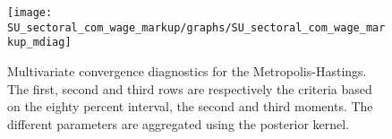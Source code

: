  
\begin{figure}[H]
\centering 
\texttt{[image: SU\_sectoral\_com\_wage\_markup/graphs/SU\_sectoral\_com\_wage\_markup\_mdiag]}
\caption{Multivariate convergence diagnostics for the Metropolis-Hastings.
The first, second and third rows are respectively the criteria based on
the eighty percent interval, the second and third moments. The different 
parameters are aggregated using the posterior kernel.}\label{Fig:MultivariateDiagnostics}
\end{figure}

